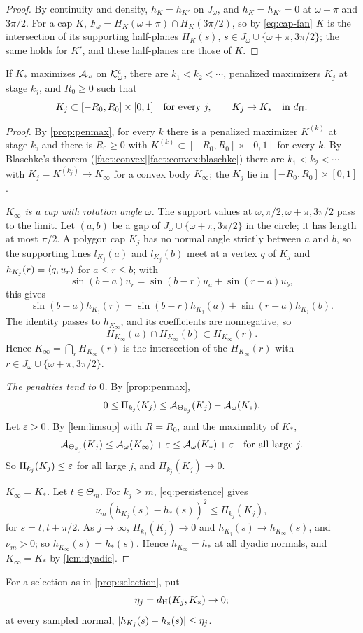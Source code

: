 \begin{proof}
By continuity and density, $h_K=h_{K'}$ on $J_\omega$, and $h_K=h_{K'}=0$ at
$\omega+\pi$ and $3\pi/2$. For a cap $K$, $F_\omega=H_K(\omega+\pi)\cap
H_K(3\pi/2)$, so by \eqref{eq:cap-fan} $K$ is the intersection of its supporting
half-planes $H_K(s)$, $s\in J_\omega\cup\{\omega+\pi,3\pi/2\}$; the same holds
for $K'$, and these half-planes are those of $K$.
\end{proof}

\begin{proposition}[selection]\label{prop:selection}
If $K_*$ maximizes $\mathcal{A}_\omega$ on $\mathcal{K}^{\mathrm{c}}_\omega$, there are $k_1<k_2<\cdots$,
penalized maximizers $K_j$ at stage $k_j$, and $R_0\ge0$ such that
\[
  K_j\subset[-R_0,R_0]\times[0,1]\quad\text{for every }j,\qquad
  K_j\to K_*\quad\text{in }d_{\mathrm{H}}.
\]
\end{proposition}

\begin{proof}
By \cref{prop:penmax}, for every $k$ there is a penalized maximizer $K^{(k)}$ at
stage $k$, and there is $R_0\ge0$ with $K^{(k)}\subset[-R_0,R_0]\times[0,1]$ for
every $k$. By Blaschke's theorem (\cref{fact:convex}\ref{fact:convex:blaschke})
there are $k_1<k_2<\cdots$ with $K_j=K^{(k_j)}\to K_\infty$ for a convex body
$K_\infty$; the $K_j$ lie in $[-R_0,R_0]\times[0,1]$.

\emph{$K_\infty$ is a cap with rotation angle $\omega$.} The support values at
$\omega,\pi/2,\allowbreak{\omega+\pi},3\pi/2$ pass to the limit. Let $(a,b)$ be
a gap of $J_\omega\cup\{\omega+\pi,3\pi/2\}$ in the circle; it has length at
most $\pi/2$. A polygon cap $K_j$ has no normal angle strictly between $a$ and
$b$, so the supporting lines $l_{K_j}(a)$ and $l_{K_j}(b)$ meet at a vertex $q$
of $K_j$ and $h_{K_j}(r)=\langle q,u_r\rangle$ for $a\le r\le b$; with
\[
  \sin(b-a)u_r=\sin(b-r)u_a+\sin(r-a)u_b,
\]
this gives
\[
  \sin(b-a)h_{K_j}(r)=\sin(b-r)h_{K_j}(a)+\sin(r-a)h_{K_j}(b).
\]
The identity passes to $h_{K_\infty}$, and its coefficients are nonnegative, so
\[
  H_{K_\infty}(a)\cap H_{K_\infty}(b)\subset H_{K_\infty}(r).
\]
Hence $K_\infty=\bigcap_rH_{K_\infty}(r)$ is the intersection of the
$H_{K_\infty}(r)$ with $r\in J_\omega\cup\{\omega+\pi,3\pi/2\}$.

\emph{The penalties tend to $0$.} By \cref{prop:penmax},
\[
  0\le\Pi_{k_j}(K_j)\le\mathcal{A}_{\Theta_{k_j}}(K_j)-\mathcal{A}_\omega(K_*).
\]
Let $\varepsilon>0$. By \cref{lem:limsup} with $R=R_0$, and the maximality of $K_*$,
\[
  \mathcal{A}_{\Theta_{k_j}}(K_j)\le\mathcal{A}_\omega(K_\infty)+\varepsilon\le\mathcal{A}_\omega(K_*)+\varepsilon
    \quad\text{for all large }j.
\]
So $\Pi_{k_j}(K_j)\le\varepsilon$ for all large $j$, and $\Pi_{k_j}(K_j)\to0$.

\emph{$K_\infty=K_*$.} Let $t\in\Theta_m$. For $k_j\ge m$,
\eqref{eq:persistence} gives
\[
  \nu_m(h_{K_j}(s)-h_*(s))^2\le\Pi_{k_j}(K_j),
\]
for $s=t,t+\pi/2$. As $j\to\infty$, $\Pi_{k_j}(K_j)\to0$ and $h_{K_j}(s)\to
h_{K_\infty}(s)$, and $\nu_m>0$; so $h_{K_\infty}(s)=h_*(s)$. Hence
$h_{K_\infty}=h_*$ at all dyadic normals, and $K_\infty=K_*$ by
\cref{lem:dyadic}.
\end{proof}

For a selection as in \cref{prop:selection}, put
\[
  \eta_j=d_{\mathrm{H}}(K_j,K_*)\to0;
\]
at every sampled normal, $\lvert h_{K_j}(s)-h_*(s)\rvert\le\eta_j$.
